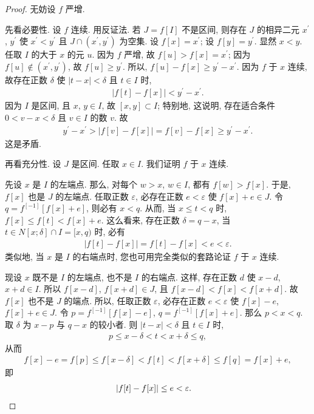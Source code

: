 \begin{proof}
    无妨设 $f$ 严增.

    先看必要性.
    设 $f$ 连续.
    用反证法.
    若 $J = f[I]$ 不是区间,
    则存在 $J$ 的相异二元 $x^{\prime}$, $y^{\prime}$ 使
    $x^{\prime} < y^{\prime}$
    且
    $J \cap (x^{\prime}, y^{\prime})$
    为空集.
    设 $f[x] = x^{\prime}$;
    设 $f[y] = y^{\prime}$.
    显然 $x < y$.
    任取 $I$ 的大于 $x$ 的元 $u$.
    因为 $f$ 严增,
    故 $f[u] > f[x] = x^{\prime}$;
    因为 $f[u] \notin (x^{\prime}, y^{\prime})$,
    故 $f[u] \geq y^{\prime}$.
    所以,
    $f[u] - f[x] \geq y^{\prime} - x^{\prime}$.
    因为 $f$ 于 $x$ 连续,
    故存在正数 $\delta$ 使
    $|t - x| < \delta$ 且 $t \in I$ 时,
    \begin{align*}
        |f[t] - f[x]| < y^{\prime} - x^{\prime}.
    \end{align*}
    因为 $I$ 是区间, 且 $x$, $y \in I$,
    故 $[x, y] \subset I$;
    特别地, 这说明, 存在适合条件
    $0 < v - x < \delta$ 且 $v \in I$ 的数 $v$.
    故
    \begin{align*}
        y^{\prime} - x^{\prime} > |f[v] - f[x]| = f[v] - f[x] \geq y^{\prime} - x^{\prime}.
    \end{align*}
    这是矛盾.

    再看充分性.
    设 $J$ 是区间.
    任取 $x \in I$.
    我们证明 $f$ 于 $x$ 连续.

    先设 $x$ 是 $I$ 的左端点.
    那么, 对每个 $w > x$, $w \in I$, 都有 $f[w] > f[x]$.
    于是, $f[x]$ 也是 $J$ 的左端点.
    任取正数 $\varepsilon$, 必存在正数 $e < \varepsilon$
    使 $f[x] + e \in J$.
    令 $q = f^{[-1]} [f[x] + e]$, 则必有 $x < q$.
    从而, 当 $x \leq t < q$ 时, $f[x] \leq f[t] < f[x] + e$.
    这么看来, 存在正数 $\delta = q - x$,
    当 $t \in N[x; \delta] \cap I = [x, q)$ 时, 必有
    \begin{align*}
        |f[t] - f[x]| = f[t] - f[x] < e < \varepsilon.
    \end{align*}
    类似地, 当 $x$ 是 $I$ 的右端点时,
    您也可用完全类似的套路论证 $f$ 于 $x$ 连续.

    现设 $x$ 既不是 $I$ 的左端点, 也不是 $I$ 的右端点.
    这样, 存在正数 $d$ 使 $x - d$, $x + d \in I$.
    所以 $f[x - d]$, $f[x + d] \in J$,
    且 $f[x - d] < f[x] < f[x + d]$.
    故 $f[x]$ 也不是 $J$ 的端点.
    所以, 任取正数 $\varepsilon$,
    必存在正数 $e < \varepsilon$ 使
    $f[x] - e$, $f[x] + e \in J$.
    令 $p = f^{[-1]} [f[x] - e]$,
    $q = f^{[-1]} [f[x] + e]$.
    那么 $p < x < q$.
    取 $\delta$ 为 $x - p$ 与 $q - x$ 的较小者.
    则 $|t - x| < \delta$ 且 $t \in I$ 时,
    \begin{align*}
        p \leq x - \delta < t < x + \delta \leq q,
    \end{align*}
    从而
    \begin{align*}
        f[x] - e = f[p] \leq f[x - \delta] < f[t] < f[x + \delta] \leq f[q] = f[x] + e,
    \end{align*}
    即
    \begin{align*}
         & {|f[t] - f[x]| \leq e < \varepsilon.} \qedhere
    \end{align*}
\end{proof}

